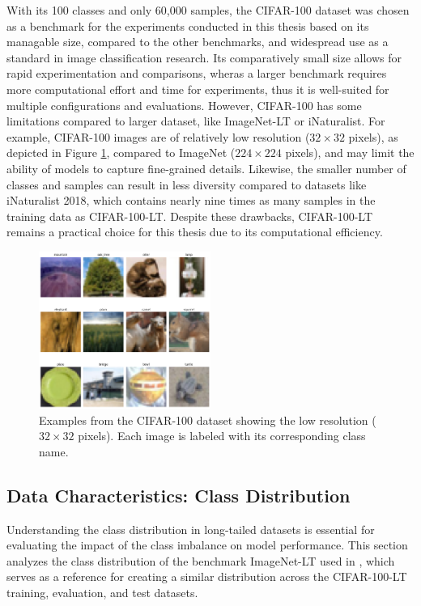 With its 100 classes and only 60,000 samples, the CIFAR-100 dataset was chosen as a benchmark for the experiments conducted in this thesis based on its managable size, compared to the other benchmarks, and widespread use as a standard in image classification research. Its comparatively small size allows for rapid experimentation and comparisons, wheras a larger benchmark requires more computational effort and time for experiments, thus it is well-suited for multiple configurations and evaluations. However, CIFAR-100 has some limitations compared to larger dataset, like ImageNet-LT or iNaturalist. For example, CIFAR-100 images are of relatively low resolution ($32 \times 32$ pixels), as depicted in Figure \ref{fig:cifar100_images}, compared to ImageNet ($224 \times 224$ pixels), and may limit the ability of models to capture fine-grained details. Likewise, the smaller number of classes and samples can result in less diversity compared to datasets like iNaturalist 2018, which contains nearly nine times as many samples in the training data as CIFAR-100-LT. Despite these drawbacks, CIFAR-100-LT remains a practical choice for this thesis due to its computational efficiency. 

\begin{figure}[h!]
    \centering
    \includegraphics[width=0.5\textwidth]{Images/cifar100_sample_grid.png}
    \caption{Examples from the CIFAR-100 dataset showing the low resolution ($32 \times 32$ pixels). Each image is labeled with its corresponding class name.}
    \label{fig:cifar100_images}
\end{figure}

\subsection{Data Characteristics: Class Distribution}
Understanding the class distribution in long-tailed datasets is essential for evaluating the impact of the class imbalance on model performance. This section analyzes the class distribution of the benchmark ImageNet-LT used in \cite{zhang2023deep}, which serves as a reference for creating a similar distribution across the CIFAR-100-LT training, evaluation, and test datasets.  

